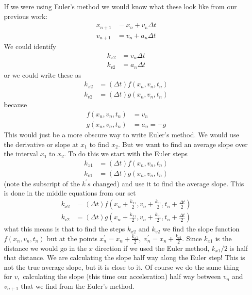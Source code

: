 \documentclass{book}
\begin{document}
If we were using Euler's method we would know what these look like from our
previous work: 
\begin{align*}
x_{n+1}  & =x_{n}+v_{n}\Delta t\\
v_{n+1}  & =v_{n}+a_{n}\Delta t
\end{align*}
We could identify \begin{align*}
k_{x2}  & =v_{n}\Delta t\\
k_{v2}  & =a_{n}\Delta t
\end{align*}
or we could write these as
\begin{align*}
k_{x2}  & =(\Delta t)f(x_{n},v_{n},t_{n})\\
k_{v2}  & =(\Delta t)g(x_{n},v_{n},t_{n})
\end{align*}
because
\begin{align*}
f(x_{n},v_{n},t_{n})  & =v_{n}\\
g(x_{n},v_{n},t_{n})  & =a_{n}=-g
\end{align*}
This would just be a more obscure way to write Euler's method. We would use
the derivative or slope at $x_{1}$ to find $x_{2}.$ But we want to find an
average slope over the interval $x_{1}$ to $x_{2}.$ To do this we start with
the Euler steps
\begin{align*}
k_{x1}  & =(\Delta t)f(x_{n},v_{n},t_{n})\\
k_{v1}  & =(\Delta t)g(x_{n},v_{n},t_{n})
\end{align*}
(note the subscript of the $k^{\prime}s$ changed) and use it to find the
average slope. This is done in the middle equations from our set \begin{align*}
k_{x2}  & =(\Delta t)f\left(  x_{n}+\frac{k_{x1}}{2},v_{n}+\frac{k_{v1}} {2},t_{n}+\frac{\Delta t}{2}\right) \\
k_{v2}  & =(\Delta t)g\left(  x_{n}+\frac{k_{x1}}{2},v_{n}+\frac{k_{v1}} {2},t_{n}+\frac{\Delta t}{2}\right)
\end{align*}
what this means is that to find the steps $k_{x2}$ and $k_{v2}$ we find the
slope function $f(x_{n},v_{n},t_{n})$ but at the points $x_{n}^{\prime} =x_{n}+\frac{k_{x1}}{2},$ $v_{n}^{\prime}=x_{n}+\frac{k_{v1}}{2}.$ Since
$k_{x1}$ is the distance we would go in the $x$ direction if we used the Euler
method, $k_{x1}/2$ is half that distance. We are calculating the slope half
way along the Euler step! This is not the true average slope, but it is close
to it. Of course we do the same thing for $v,$ calculating the slope (this
time our acceleration) half way between $v_{n}$ and $v_{n+1}$ that we find
from the Euler's method.
\end{document}
